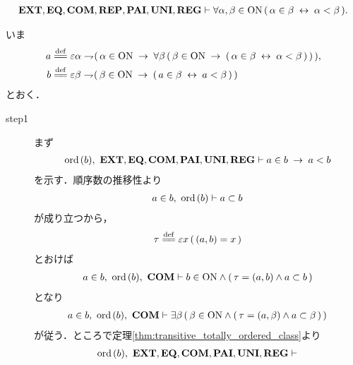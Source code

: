 	\begin{screen}
		\begin{thm}
		\label{thm:element_and_proper_subset_correspond}
			\begin{align}
				\mbox{{\bf EXT}},\mbox{{\bf EQ}},\mbox{\bf COM},\mbox{{\bf REP}},\mbox{{\bf PAI}},\mbox{{\bf UNI}},\mbox{{\bf REG}} 
				\vdash \forall \alpha,\beta \in \mathrm{ON}\, (\, \alpha \in \beta \hspace{0.25em}\leftrightarrow\hspace{0.25em} \alpha < \beta\, ).
			\end{align}
		\end{thm}
	\end{screen}
	
	\begin{prf}
		いま
		\begin{align}
			a &\defeq \varepsilon \alpha \negation 
			(\, \alpha \in \ON \rarrow \forall \beta\, (\, \beta \in \ON \rarrow 
			(\, \alpha \in \beta \lrarrow \alpha < \beta\, )\,) \,), \\
			b &\defeq \varepsilon \beta \negation (\, \beta \in \ON \rarrow 
			(\, a \in \beta \lrarrow a < \beta\, )\,)
		\end{align}
		とおく．
		\begin{description}
			\item[step1] まず
				\begin{align}
					\operatorname*{ord}\hspace{0.15em}(b),\ \mbox{{\bf EXT}},\mbox{{\bf EQ}},\mbox{\bf COM},\mbox{{\bf PAI}},\mbox{{\bf UNI}},\mbox{{\bf REG}} \vdash 
					a \in b \hspace{0.25em}\rightarrow\hspace{0.25em} a < b
				\end{align}
				を示す．順序数の推移性より
				\begin{align}
					a \in b,\ \operatorname*{ord}\hspace{0.15em}(b) \vdash a \subset b
					\label{fom:element_and_proper_subset_correspond_1}
				\end{align}
				が成り立つから，
				\begin{align}
					\tau \defeq \varepsilon x\, (\, (a,b) = x\, )
				\end{align}
				とおけば
				\begin{align}
					a \in b,\ \operatorname*{ord}\hspace{0.15em}(b),\ \mbox{\bf COM} 
					\vdash b \in \mathrm{ON} \wedge (\, \tau = (a,b) \wedge a \subset b\, )
				\end{align}
				となり
				\begin{align}
					a \in b,\ \operatorname*{ord}\hspace{0.15em}(b),\ \mbox{\bf COM}  
					\vdash \exists \beta\, (\, \beta \in \mathrm{ON} \wedge 
					(\, \tau = (a,\beta) \wedge a \subset \beta\, )\, )
					\label{fom:element_and_proper_subset_correspond_2}
				\end{align}
				が従う．ところで定理\ref{thm:transitive_totally_ordered_class}より
				\begin{align}
					\ord{b},\ \EXTAX,\EQAX,\COMAX,\PAIAX,\UNIAX,\REGAX \vdash 

\end{align}
\end{description}
\end{prf}
